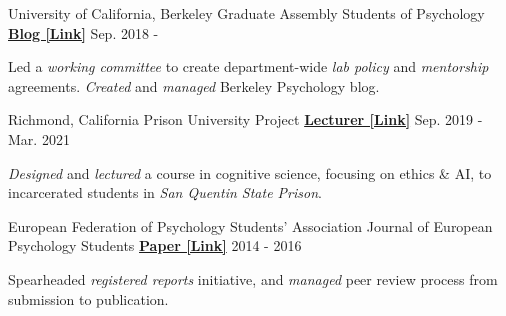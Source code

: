 \begin{cventries}

  \cventry 
    {University of California, Berkeley} %
    {Graduate Assembly Students of Psychology}
    {\href{https://psychblog.berkeley.edu/blog/}{\textbf{Blog [Link]}}} %
    {Sep. 2018 - } %
    {
      \begin{cvitems} %
        \item {Led a \textit{working committee} to create department-wide \textit{lab policy} and \textit{mentorship} agreements. \textit{Created} and \textit{managed} Berkeley Psychology blog.}
      \end{cvitems}
    }
    
  \cventry
    {Richmond, California} %
    {Prison University Project}
    {\href{https://www.mttamcollege.org/}{\textbf{Lecturer [Link]}}} %
    {Sep. 2019 - Mar. 2021} %
    {
      \begin{cvitems} %
        \item {\textit{Designed} and \textit{lectured} a course in cognitive science, focusing on ethics \& AI, to incarcerated students in \textit{San Quentin State Prison}.}
      \end{cvitems}
    }
    
    
  \cventry
    {European Federation of Psychology Students' Association}
    {Journal of European Psychology Students} %
    {\href{https://jeps.efpsa.org/articles}{\textbf{Paper [Link]}}} %
    {2014 - 2016} %
    {
      \begin{cvitems} %
        \item {Spearheaded \textit{registered reports} initiative, and \textit{managed} peer review process from submission to publication.}
      \end{cvitems}
    }
    

\end{cventries}
